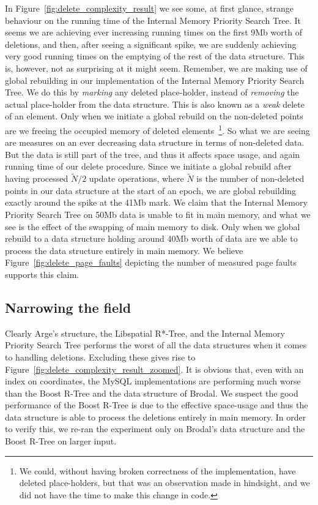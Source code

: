 \documentclass[twoside,11pt,openright]{report}
\def \bar {\widetilde}
\begin{document}
In Figure~\ref{fig:delete_complexity_result} we see some, at first glance, strange behaviour on the running time of the Internal Memory Priority Search Tree. It seems we are achieving ever increasing running times on the first 9Mb worth of deletions, and then, after seeing a significant spike, we are suddenly achieving very good running times on the emptying of the rest of the data structure. This is, however, not as surprising at it might seem. Remember, we are making use of global rebuilding in our implementation of the Internal Memory Priority Search Tree. We do this by \textit{marking} any deleted place-holder, instead of \textit{removing} the actual place-holder from the data structure. This is also known as a \textit{weak} delete of an element. Only when we initiate a global rebuild on the non-deleted points are we freeing the occupied memory of deleted elements~\footnote{We could, without having broken correctness of the implementation, have deleted place-holders, but that was an observation made in hindsight, and we did not have the time to make this change in code.}. So what we are seeing are measures on an ever decreasing data structure in terms of non-deleted data. But the data is still part of the tree, and thus it affects space usage, and again running time of our delete procedure. Since we initiate a global rebuild after having processed $\bar{N} / 2$ update operations, where $\bar{N}$ is the number of non-deleted points in our data structure at the start of an epoch, we are global rebuilding exactly around the spike at the 41Mb mark. We claim that the Internal Memory Priority Search Tree on 50Mb data is unable to fit in main memory, and what we see is the effect of the swapping of main memory to disk. Only when we global rebuild to a data structure holding around 40Mb worth of data are we able to process the data structure entirely in main memory. We believe Figure~\ref{fig:delete_page_faults} depicting the number of measured page faults supports this claim.

\subsection*{Narrowing the field}

Clearly Arge's structure, the Libspatial R*-Tree, and the Internal Memory Priority Search Tree performs the worst of all the data structures when it comes to handling deletions. Excluding these gives rise to Figure~\ref{fig:delete_complexity_result_zoomed}. It is obvious that, even with an index on coordinates, the MySQL implementations are performing much worse than the Boost R-Tree and the data structure of Brodal. We suspect the good performance of the Boost R-Tree is due to the effective space-usage and thus the data structure is able to process the deletions entirely in main memory. In order to verify this, we re-ran the experiment only on Brodal's data structure and the Boost R-Tree on larger input.
\end{document}
